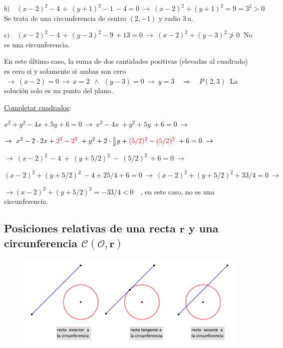 \begin{miejercicio}
\color{gris}
\vspace{2mm} \textcolor{gris}{$b) \quad (x-2)^2-4\, + \, (y+1)^2-1\, -4 =0 \ \to \ (x-2)^2+(y+1)^2=9=3^2>0 \ $ Se trata de una circunferencia de centro $(2,-1)$ y radio $3\, \mathrm{u}$.}

\color{gris}
\vspace{2mm} $c)\quad (x-2)^2-4\, + \, (y-3)^2-9 \, + 13 = 0 \ \to \ (x-2)^2+(y-3)^2 \not > 0 \ $ No es una circunferencia. 

\color{gris}
\vspace{2mm} En este último caso, la suma de dos cantidades positivas (elevadas al cuadrado) es cero si y solamente si ambas son cero $\ \to \ (x-2)=0 \ \to \ x= 2 \ \ \wedge \ \ (y-3)=0 \ \to \ y=3 \quad \Rightarrow \quad P(2,3)\ $ La solución solo es un punto del plano.

\color{NavyBlue}
\begin{adjustwidth}{20pt}{20pt}
\vspace{6mm}\underline{Completar cuadrados}:

\vspace{2mm} $x^2+y^2-4x+5y+6=0 \ \to \ x^2-4x\ +y^2+5y \ +6=0 \ \to \ $

$\to \ x^2-2\cdot 2x + \textcolor{red}{ 2^2 - 2^2 }\ +y^2+2\cdot \frac 52 y + \textcolor{red}{(5/2)^2-(5/2)^2}\ +6=0  \ \to \ $

$\to \ (x-2)^2 \ -4 \ + \ (y+ 5/2)^2 \ - \ (5/2)^2\ + 6 = 0 \ \to \ $

$(x-2)^2+(y+5/2)^2\ -4+25/4+6 =0 \ \to \ (x-2)^2+(y+5/2)^2+33/4 = 0 \ \to $

$\to (x-2)^2+(y+5/2)^2=-33/4 < 0 \quad $, en este caso, no es una circunferencia.
\end{adjustwidth}
\color{black}
\end{miejercicio}

\vspace{0.5cm}

\subsection{Posiciones relativas de una recta $\boldsymbol r$ y una circunferencia $\boldsymbol{\mathcal C(\mathcal O,r)}$}
\vspace{0.5cm}
\begin{figure}[H]
	\centering
	\includegraphics[width=1\textwidth]{img-conicas/conicas21.png}
	\end{figure}


